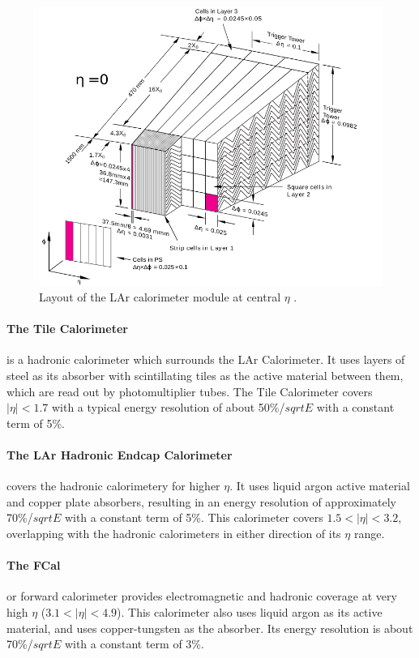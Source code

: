 \begin{centering}
\begin{figure}[!htb]
\myfloatalign
\includegraphics[width=.90\linewidth]{figures/atlas/LARG3-TDR-barrelM_samplings_presamp_new.png}
\caption{Layout of the LAr calorimeter module at central $\eta$ \cite{PERF-2007-01}.}
\label{fig:calo_mod}
\end{figure}
\end{centering}

\paragraph{The Tile Calorimeter} is a hadronic calorimeter which surrounds the LAr Calorimeter. It uses layers of steel as its absorber with scintillating tiles as the active material between them, which are read out by photomultiplier tubes. The Tile Calorimeter covers $|\eta| < 1.7$ with a typical energy resolution of about 50\%/$sqrt{E}$ with a constant term of 5\%. 

\paragraph{The LAr Hadronic Endcap Calorimeter} covers the hadronic calorimetery for higher $\eta$. It uses liquid argon active material and copper plate absorbers, resulting in an energy resolution of approximately 70\%/$sqrt{E}$ with a constant term of 5\%. This calorimeter covers $1.5 < |\eta| < 3.2$, overlapping with the hadronic calorimeters in either direction of its $\eta$ range. 

\paragraph{The FCal} or forward calorimeter provides electromagnetic and hadronic coverage at very high $\eta$ ($3.1 < |\eta| < 4.9$). This calorimeter also uses liquid argon as its active material, and uses copper-tungsten as the absorber. Its energy resolution is about 70\%/$sqrt{E}$ with a constant term of 3\%.

